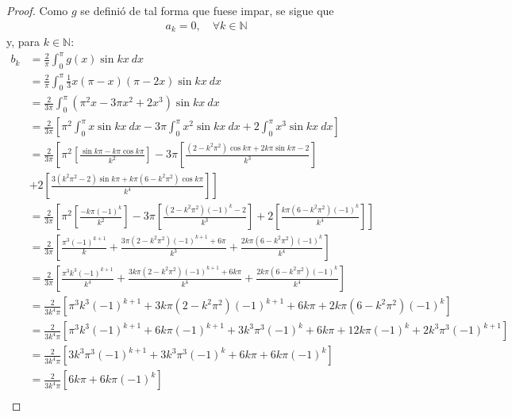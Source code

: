 \documentclass[12pt]{report}
\theoremstyle{largebreak}
\begin{document}
\begin{proof}
        Como $g$ se definió de tal forma que fuese impar, se sigue que
        \begin{equation*}
            \begin{split}
                a_k=0,\quad\forall k\in\mathbb{N}
            \end{split}
        \end{equation*}
        y, para $k\in\mathbb{N}$:
        \begin{equation*}
            \begin{split}
                b_k&=\frac{2}{\pi}\int_{0}^{\pi}g(x)\sin kx\:dx \\
                &=\frac{2}{\pi}\int_{0}^{\pi}\frac{1}{3}x(\pi-x)(\pi-2x) \sin kx\:dx\\
                &=\frac{2}{3\pi}\int_{0}^{\pi}(\pi^2x-3\pi x^2+2x^3)\sin kx\:dx\\
                &=\frac{2}{3\pi}\left[\pi^2\int_{0}^{\pi}x\sin kx\:dx-3\pi\int_{0}^{\pi}x^2\sin kx\:dx+2\int_{0}^{\pi}x^3\sin kx\:dx \right]\\
                &=\frac{2}{3\pi}\left[\pi^2\left[\frac{\sin k\pi-k\pi\cos k\pi}{k^2} \right] -3\pi\left[\frac{(2-k^2\pi^2)\cos k\pi+2k\pi\sin k\pi-2}{k^3}\right]\right.\\
                &\left.+2\left[\frac{3(k^2\pi^2-2)\sin k\pi+k\pi(6-k^2\pi^2)\cos k\pi}{k^4}\right]\right]\\
                &=\frac{2}{3\pi}\left[\pi^2\left[\frac{-k\pi(-1)^k}{k^2} \right] -3\pi\left[\frac{(2-k^2\pi^2)(-1)^k-2}{k^3}\right]+2\left[\frac{k\pi(6-k^2\pi^2)(-1)^k}{k^4}\right]\right]\\
                &=\frac{2}{3\pi}\left[\frac{\pi^3(-1)^{k+1}}{k}+\frac{3\pi(2-k^2\pi^2)(-1)^{k+1}+6\pi}{k^3}+\frac{2k\pi(6-k^2\pi^2)(-1)^k}{k^4}\right]\\
                &=\frac{2}{3\pi}\left[\frac{\pi^3k^3(-1)^{k+1}}{k^4}+\frac{3k\pi(2-k^2\pi^2)(-1)^{k+1}+6k\pi}{k^4}+\frac{2k\pi(6-k^2\pi^2)(-1)^k}{k^4}\right]\\
                &=\frac{2}{3k^4\pi}\left[\pi^3k^3(-1)^{k+1}+3k\pi(2-k^2\pi^2)(-1)^{k+1}+6k\pi+2k\pi(6-k^2\pi^2)(-1)^k\right]\\
                &=\frac{2}{3k^4\pi}\left[\pi^3k^3(-1)^{k+1}+6k\pi(-1)^{k+1}+3k^3\pi^3(-1)^{k}+6k\pi+12k\pi(-1)^k+2k^3\pi^3(-1)^{ k+1}\right]\\
                &=\frac{2}{3k^4\pi}\left[3k^3\pi^3(-1)^{k+1}+3k^3\pi^3(-1)^{k}+6k\pi+6k\pi(-1)^k\right]\\
                &=\frac{2}{3k^4\pi}\left[6k\pi+6k\pi(-1)^k\right]\\

\end{split}
\end{equation*}
\end{proof}
\end{document}
